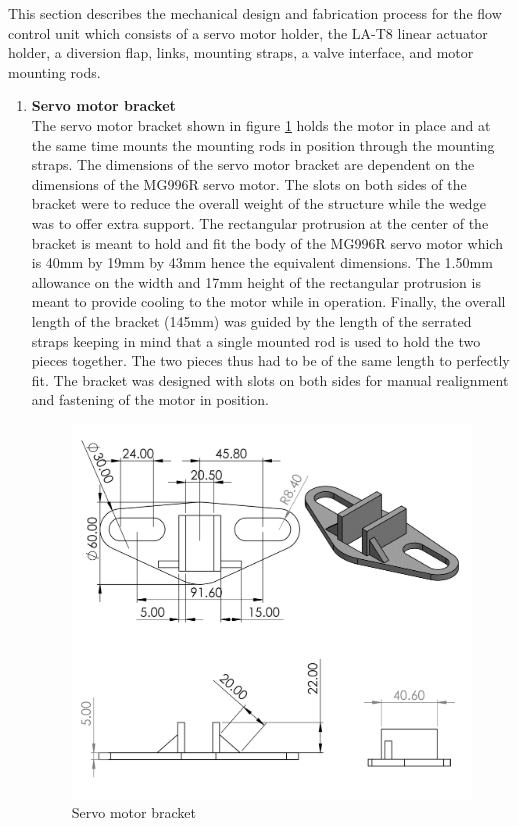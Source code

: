 This section describes the mechanical design and fabrication process for the flow control unit which consists of a servo motor holder, the LA-T8 linear actuator holder, a diversion flap, links, mounting straps, a valve interface, and motor mounting rods.
\begin{enumerate}
    \item \textbf{Servo motor bracket }\\
The servo motor bracket shown in figure \ref{fig: Servo Holder} holds the motor in place and at the same time mounts the mounting rods in position through the mounting straps. The dimensions of the servo motor bracket are dependent on the dimensions of the MG996R servo motor. The slots on both sides of the bracket were to reduce the overall weight of the structure while the wedge was to offer extra support. The rectangular protrusion at the center of the bracket is meant to hold and fit the body of the MG996R servo motor which is 40mm by 19mm by 43mm hence the equivalent dimensions. The 1.50mm allowance on the width and 17mm height of the rectangular protrusion is meant to provide cooling to the motor while in operation. Finally, the overall length of the bracket (145mm) was guided by the length of the serrated straps keeping in mind that a single mounted rod is used to hold the two pieces together. The two pieces thus had to be of the same length to perfectly fit. The bracket was designed with slots on both sides for manual realignment and fastening of the motor in position. 
\begin{figure}[H]
\centering
\includegraphics{Figures/ServoBracket.JPG}
\caption{Servo motor bracket}
\label{fig: Servo Holder}
\end{figure}


\end{enumerate}
